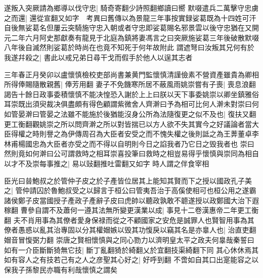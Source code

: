 遂叛入突厥請為鄉導以伐守忠|{
	騎奇寄翻少詩照翻鄉讀曰嚮}
默啜遣兵二萬擊守忠虜之而還|{
	還從宣翻又如字　考異曰舊傳以為景龍三年事按實録娑葛既為十四姓可汗自後無娑葛名但屢云突騎施守忠入朝或者守忠即娑葛賜名邪景雲以後守忠猶在又開元二年六月阿史那獻奏有龍見于北庭為鎮將妻馮言之曰突厥施娑葛三年後破散默啜八年後自滅然則娑葛於時尚在也竟不知死于何年故附此}
謂遮弩曰汝叛其兄何有於我遂幷殺之|{
	書此以戒兄弟日尋干戈而假手於他人以逞其志者}


三年春正月癸卯以盧懷慎檢校吏部尚書兼黄門監懷慎清謹儉素不營資產雖貴為卿相所得俸賜隨散親舊|{
	俸芳用翻}
妻子不免饑寒所居不蔽風雨姚崇嘗有子喪|{
	喪息浪翻}
謁告十餘日政事委積懷慎不能决惶恐入謝於上上曰朕以天下事委姚崇以卿坐鎮雅俗耳崇既出須臾裁决俱盡頗有得色顧謂紫微舍人齊澣曰予為相可比何人澣未對崇曰何如管晏澣曰管晏之法雖不能施於後猶能沒身公所為法隨復更之似不及也|{
	復扶又翻更工衡翻觀姚崇之所以問齊澣之所以對皆揣已以方人欲不失其實今之好議論者當大臣得權之時則譽之為伊傳周召為大臣者安受之而不愧失權之後則詆之為王莾董卓李林甫楊國忠為大臣者亦受之而不得以自明則今日之諂我者乃它日之毁我者也}
崇曰然則竟如何澣曰公可謂救時之相耳崇喜投筆曰救時之相豈易得乎懷慎與崇同為相自以才不及崇每事推之|{
	易以䜴翻推吐雷翻又如字}
時人謂之伴食宰相

臣光曰㫺鮑叔之於管仲子皮之於子產皆位居其上能知其賢而下之授以國政孔子美之|{
	管仲請囚於魯鮑叔受之以歸言于桓公曰管夷吾治于高傒使相可也桓公用之遂霸諸侯鄭子皮當國授子產政子產辭子皮曰虎帥以聽政孰敢不聼遂授以政鄭國大治下遐稼翻}
曹參自謂不及蕭何一遵其法無所變更漢業以成|{
	事見十二卷漢惠帝二年更工衡翻}
夫不肖用事為其僚者愛身保禄而從之不顧國家之安危是誠罪人也賢智用事為其僚者愚惑以亂其治專固以分其權媢嫉以毁其功愎戾以竊其名是亦辠人也|{
	治直吏翻媢音冒愎弼力翻}
崇唐之賢相懷慎與之同心勠力以濟明皇太平之政夫何辠哉秦誓曰如有一介臣斷斷猗無它技|{
	斷丁亂翻猗於綺翻乂於宜翻技渠綺翻下同}
其心休休焉其如有容人之有技若己有之人之彦聖其心好之|{
	好呼到翻}
不啻如自其口出寔能容之以保我子孫黎民亦職有利哉懷慎之謂矣

